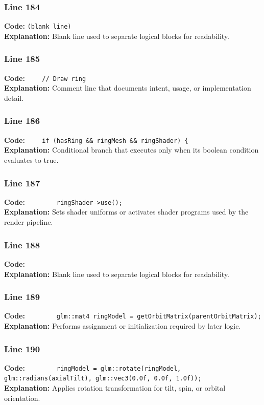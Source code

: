 \documentclass[11pt,a4paper]{article}
\begin{document}
\subsubsection*{Line 184}
\textbf{Code:} \texttt{(blank line)}\\
\textbf{Explanation:} Blank line used to separate logical blocks for readability.

\subsubsection*{Line 185}
\textbf{Code:} \verb|    // Draw ring|\\
\textbf{Explanation:} Comment line that documents intent, usage, or implementation detail.

\subsubsection*{Line 186}
\textbf{Code:} \verb|    if (hasRing && ringMesh && ringShader) {|\\
\textbf{Explanation:} Conditional branch that executes only when its boolean condition evaluates to true.

\subsubsection*{Line 187}
\textbf{Code:} \verb|        ringShader->use();|\\
\textbf{Explanation:} Sets shader uniforms or activates shader programs used by the render pipeline.

\subsubsection*{Line 188}
\textbf{Code:} \verb|        |\\
\textbf{Explanation:} Blank line used to separate logical blocks for readability.

\subsubsection*{Line 189}
\textbf{Code:} \verb|        glm::mat4 ringModel = getOrbitMatrix(parentOrbitMatrix);|\\
\textbf{Explanation:} Performs assignment or initialization required by later logic.

\subsubsection*{Line 190}
\textbf{Code:} \verb|        ringModel = glm::rotate(ringModel, glm::radians(axialTilt), glm::vec3(0.0f, 0.0f, 1.0f));|\\
\textbf{Explanation:} Applies rotation transformation for tilt, spin, or orbital orientation.
\end{document}
